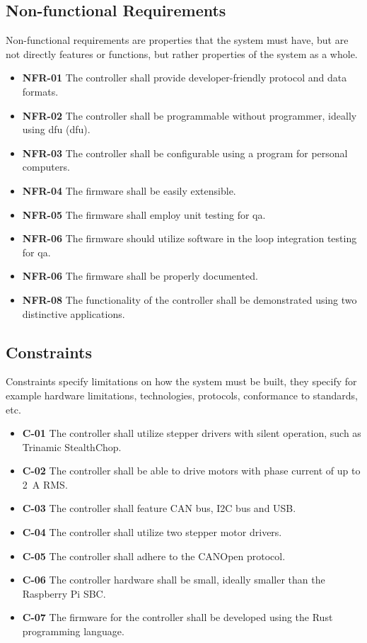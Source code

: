 \subsection{Non-functional Requirements}
\label{subsec:nonfunc_req}
Non-functional requirements are properties that the system must have, but are not directly features or functions, but rather properties of the system as a whole.

\begin{itemize}
    \item \textbf{NFR-01} The controller shall provide developer-friendly protocol and data formats.
    \item \textbf{NFR-02} The controller shall be programmable without programmer, ideally using \acs{dfu} (\acl{dfu}).
    \item \textbf{NFR-03} The controller shall be configurable using a program for personal computers.
    \item \textbf{NFR-04} The firmware shall be easily extensible.
    \item \textbf{NFR-05} The firmware shall employ unit testing for \acs{qa}.
    \item \textbf{NFR-06} The firmware should utilize software in the loop integration testing for \acs{qa}.
    \item \textbf{NFR-06} The firmware shall be properly documented.
    \item \textbf{NFR-08} The functionality of the controller shall be demonstrated using two distinctive applications.
\end{itemize}

\subsection{Constraints}
\label{subsec:constraints}
Constraints specify limitations on how the system must be built, they specify for example hardware limitations, technologies, protocols, conformance to standards, etc.

\begin{itemize}
    \item \textbf{C-01} The controller shall utilize stepper drivers with silent operation, such as Trinamic StealthChop\texttrademark.
    \item \textbf{C-02} The controller shall be able to drive motors with phase current of up to 2~A RMS.
    \item \textbf{C-03} The controller shall feature CAN bus, I2C bus and USB.
    \item \textbf{C-04} The controller shall utilize two stepper motor drivers.
    \item \textbf{C-05} The controller shall adhere to the CANOpen protocol.
    \item \textbf{C-06} The controller hardware shall be small, ideally smaller than the Raspberry Pi SBC.
    \item \textbf{C-07} The firmware for the controller shall be developed using the Rust programming language.
\end{itemize}